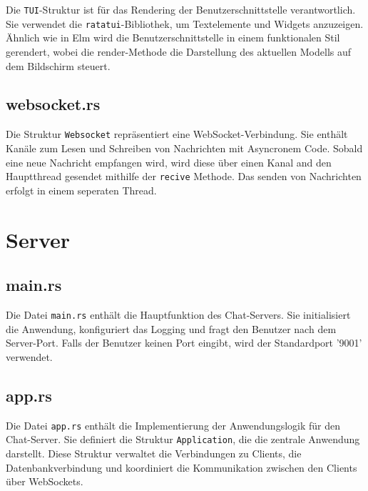 \documentclass[a4paper]{article}
\begin{document}
Die \texttt{TUI}-Struktur ist für das Rendering der Benutzerschnittstelle verantwortlich. Sie verwendet die \texttt{ratatui}-Bibliothek, um Textelemente und Widgets anzuzeigen. Ähnlich wie in Elm wird die Benutzerschnittstelle in einem funktionalen Stil gerendert, wobei die render-Methode die Darstellung des aktuellen Modells auf dem Bildschirm steuert.


\subsection{websocket.rs} \label{ws_client}

Die Struktur \texttt{Websocket} repräsentiert eine WebSocket-Verbindung. Sie enthält Kanäle zum Lesen und Schreiben von Nachrichten mit Asyncronem Code. Sobald eine neue Nachricht empfangen wird, wird diese über einen Kanal and den Hauptthread gesendet mithilfe der \texttt{recive} Methode. Das senden von Nachrichten erfolgt in einem seperaten Thread.


\section{Server}


\subsection{main.rs}

Die Datei \texttt{main.rs} enthält die Hauptfunktion des Chat-Servers. Sie initialisiert die Anwendung, konfiguriert das Logging und fragt den Benutzer nach dem Server-Port. Falls der Benutzer keinen Port eingibt, wird der Standardport '9001' verwendet.

\subsection{app.rs}



Die Datei \texttt{app.rs} enthält die Implementierung der Anwendungslogik für den Chat-Server. Sie definiert die Struktur \texttt{Application}, die die zentrale Anwendung darstellt. Diese Struktur verwaltet die Verbindungen zu Clients, die Datenbankverbindung und koordiniert die Kommunikation zwischen den Clients über WebSockets.
\end{document}
